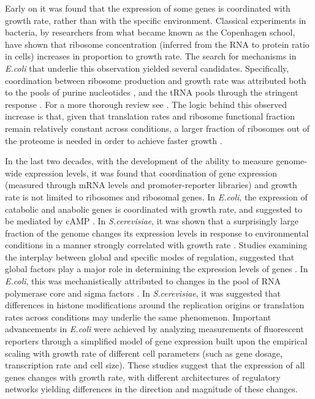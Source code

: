 \documentclass[notitlepage]{article}
\begin{document}
Early on it was found that the expression of some genes is coordinated with growth rate, rather than with the specific environment.
Classical experiments in bacteria, by researchers from what became known as the Copenhagen school, have shown that ribosome concentration (inferred from the RNA to protein ratio in cells) increases in proportion to growth rate\parencite{Schaechter1958}.
The search for mechanisms in \emph{E.coli} that underlie this observation yielded several candidates.
Specifically, coordination between ribosome production and growth rate was attributed both to the pools of purine nucleotides \parencite{Gourse1996,Gaal1997}, and the tRNA pools through the stringent response \parencite{Chatterji2001,Brauer2008a}.
For a more thorough review see \parencite{Nomura1984}.
The logic behind this observed increase is that, given that translation rates and ribosome functional fraction remain relatively constant across conditions, a larger fraction of ribosomes out of the proteome is needed in order to achieve faster growth \parencite{neidhardt1999a,dennis2004,Zaslaver2009}.

In the last two decades, with the development of the ability to measure genome-wide expression levels, it was found that coordination of gene expression (measured through mRNA levels and promoter-reporter libraries) and growth rate is not limited to ribosomes and ribosomal genes.
In \emph{E.coli}, the expression of catabolic and anabolic genes is coordinated with growth rate, and suggested to be mediated by cAMP \parencite{Saldanha2004}.
In \emph{S.cerevisiae}, it was shown that a surprisingly large fraction of the genome changes its expression levels in response to environmental conditions in a manner strongly correlated with growth rate \parencite{Keren2013a,Gasch2000,Castrillo2007,Zaslaver2009, Berthoumieux2013, Gerosa2013}.
Studies examining the interplay between global and specific modes of regulation, suggested that global factors play a major role in determining the expression levels of genes \parencite{Gasch2000, Klumpp2009a,Scott2010}.
In \emph{E.coli}, this was mechanistically attributed to changes in the pool of RNA polymerase core and sigma factors \parencite{Klumpp2008}.
In \emph{S.cerevisiae}, it was suggested that differences in histone modifications around the replication origins \parencite{regenberg2006} or translation rates \parencite{Gasch2000} across conditions may underlie the same phenomenon.
Important advancements in \emph{E.coli} were achieved by analyzing measurements of fluorescent reporters through a simplified model of gene expression built upon the empirical scaling with growth rate of different cell parameters (such as gene dosage, transcription rate and cell size)\parencite{Klumpp2009a}.
These studies suggest that the expression of all genes changes with growth rate, with different architectures of regulatory networks yielding differences in the direction and magnitude of these changes. 
\end{document}
